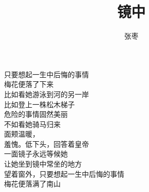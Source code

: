 \documentclass[12pt]{article}
\title{镜中}
\author{张枣}
\date{}
\begin{document}
\begin{center}
    只要想起一生中后悔的事情\\
    梅花便落了下来\\
    比如看她游泳到河的另一岸\\
    比如登上一株松木梯子\\
    危险的事情固然美丽\\
    不如看她骑马归来\\
    面颊温暖，\\
    羞愧。低下头，回答着皇帝\\
    一面镜子永远等候她\\
    让她坐到镜中常坐的地方\\
    望着窗外，只要想起一生中后悔的事情\\
    梅花便落满了南山\\
\end{center}
\end{document}
